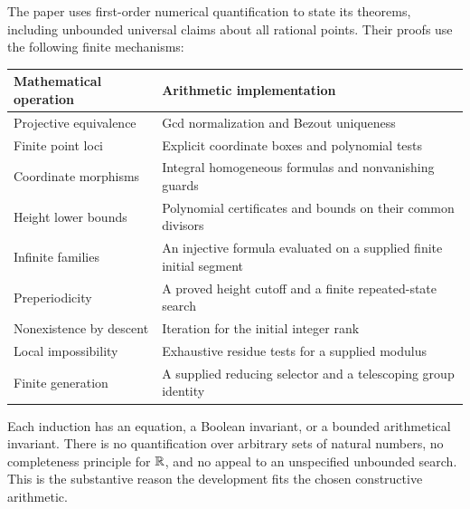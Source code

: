The paper uses first-order numerical quantification to state its theorems,
including unbounded universal claims about all rational points. Their
proofs use the following finite mechanisms:
\begin{center}
\begin{tabular}{p{}p{}}
\toprule
Mathematical operation & Arithmetic implementation \\
\midrule
Projective equivalence & Gcd normalization and Bezout uniqueness \\
Finite point loci & Explicit coordinate boxes and polynomial tests \\
Coordinate morphisms & Integral homogeneous formulas and nonvanishing guards \\
Height lower bounds & Polynomial certificates and bounds on their common divisors \\
Infinite families & An injective formula evaluated on a supplied finite initial segment \\
Preperiodicity & A proved height cutoff and a finite repeated-state search \\
Nonexistence by descent & Iteration for the initial integer rank \\
Local impossibility & Exhaustive residue tests for a supplied modulus \\
Finite generation & A supplied reducing selector and a telescoping group identity \\
\bottomrule
\end{tabular}
\end{center}
Each induction has an equation, a Boolean invariant, or a bounded
arithmetical invariant. There is no quantification over arbitrary sets of
natural numbers, no completeness principle for $\mathbb R$, and no appeal to an
unspecified unbounded search. This is the substantive reason the development
fits the chosen constructive arithmetic.
